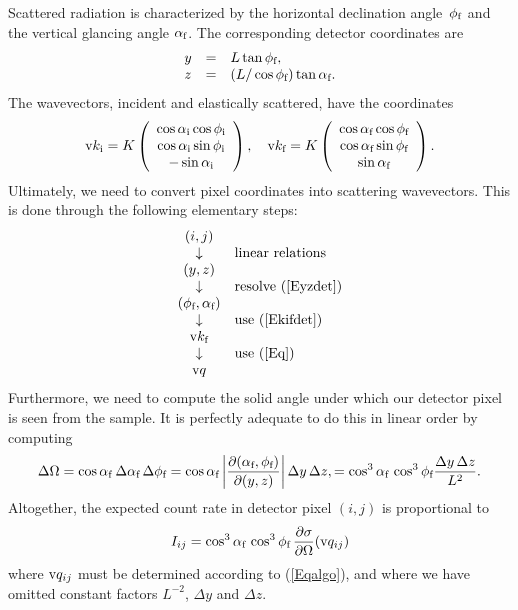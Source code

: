 Scattered radiation is characterized
by the horizontal declination angle~$\phi_{\text{f}}$
and the vertical glancing angle $\alpha_{\text{f}}$.
The corresponding detector coordinates are
\begin{equation}\label{Eyzdet}
  \begin{array}{lcl}
  y &=& L \tan\phi_{\text{f}},\\
  z &=& (L/ \cos\phi_{\text{f}}) \tan\alpha_{\text{f}}.
  \end{array}
\end{equation}
The wavevectors, incident and elastically scattered, have the coordinates
\begin{equation}\label{Ekifdet}
  \text{v}{k}_{\text{i}}=K\left(\begin{array}{c}
   \cos\alpha_{\text{i}}\cos\phi_{\text{i}}\\
   \cos\alpha_{\text{i}}\sin\phi_{\text{i}}\\
   -\sin\alpha_{\text{i}}\end{array}\right),\quad
  \text{v}{k}_{\text{f}}=K\left(\begin{array}{c}
   \cos\alpha_{\text{f}}\cos\phi_{\text{f}}\\
   \cos\alpha_{\text{f}}\sin\phi_{\text{f}}\\
   \sin\alpha_{\text{f}}\end{array}\right).
\end{equation}
Ultimately,
we need to convert pixel coordinates into scattering wavevectors.
This is done through the following elementary steps:
\begin{equation}\label{Eqalgo}
  \begin{array}{cl}
      (i,j)&\\
      \downarrow&\mbox{linear relations}\\
      (y,z)\\
      \downarrow&\mbox{resolve (\protect\ref{Eyzdet})}\\
      (\phi_{\text{f}},\alpha_{\text{f}})&\\
      \downarrow&\mbox{use (\protect\ref{Ekifdet})}\\
      \text{v}{k}_{\text{f}}&\\
      \downarrow&\mbox{use (\protect\ref{Eq})}\\
      \text{v}{q}&\\
  \end{array}
\end{equation}
Furthermore,
we need to compute the solid angle under which our detector pixel
is seen from the sample.
It is perfectly adequate to do this in linear order
by computing
\begin{equation}
  \Delta\Omega
  = \cos\alpha_{\text{f}}\:\Delta\alpha_{\text{f}}\,\Delta\phi_{\text{f}}
  = \cos\alpha_{\text{f}}
    \left|\frac{\partial(\alpha_{\text{f}},\phi_{\text{f}})}{\partial(y,z)}\right|
    \Delta y \,\Delta z,
  = \cos^3\alpha_{\text{f}}\, \cos^3\phi_{\text{f}} \frac{\Delta y \,\Delta z}{L^2}.
\end{equation}
Altogether,
the expected count rate in detector pixel $(i,j)$ is proportional to
\begin{equation}
  I_{ij} = \cos^3\alpha_{\text{f}}\, \cos^3\phi_{\text{f}}\,
          \frac{\partial\sigma}{\partial\Omega}(\text{v}{q}_{ij})
\end{equation}
where $\text{v}{q}_{ij}$ must be determined according to (\ref{Eqalgo}),
and
where we have omitted constant factors $L^{-2}$, $\Delta y$ and $\Delta z$.
